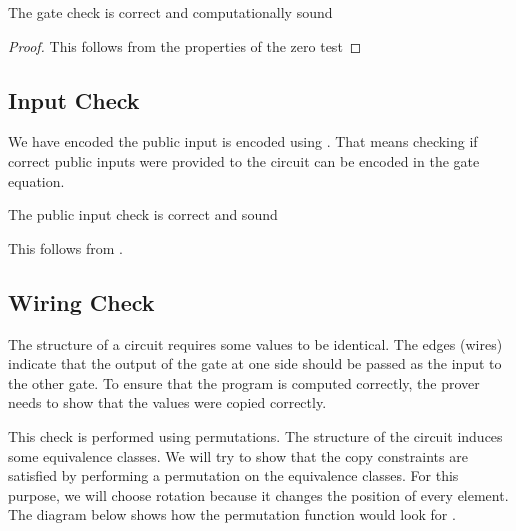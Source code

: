 \begin{lemma}
    \label{gate-correctness-soundness}
    The gate check is correct and computationally sound
\end{lemma}

\begin{proof}
    This follows from the properties of the zero test 
\end{proof}

\subsection{Input Check}
We have encoded the public input is encoded using . That means checking if correct public inputs were provided to the circuit can be encoded in the gate equation.

\begin{lemma}
    \label{input-correctness-soundness}
    The public input check is correct and sound
\end{lemma}

This follows from .

\subsection{Wiring Check}
\label{sec:wiring-check}
The structure of a circuit requires some values to be identical. The edges (wires) indicate that the output of the gate at one side should be passed as the input to the other gate. To ensure that the program is computed correctly, the prover needs to show that the values were copied correctly.

This check is performed using permutations. The structure of the circuit induces some equivalence classes. We will try to show that the copy constraints are satisfied by performing a permutation on the equivalence classes. For this purpose, we will choose rotation because it changes the position of every element. The diagram below  shows how the permutation function would look for .

